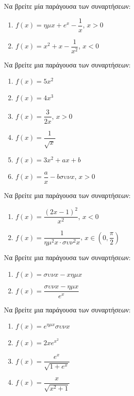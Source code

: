 \documentclass{presentation}
\begin{document}
\begin{askisi}
  Να βρείτε μία παράγουσα των συναρτήσεων:
  \begin{enumerate}[<+->]
    \item $f(x)=ημx+e^x-\dfrac{1}{x}$, $x>0$
    \item $f(x)=x^2+x-\dfrac{1}{x^2}$, $x<0$
  \end{enumerate}
\end{askisi}

\begin{askisi}
  Να βρείτε μια παράγουσα των συναρτήσεων:
  \begin{enumerate}[<+->]
    \item $f(x)=5x^2$
    \item $f(x)=4x^3$
    \item $f(x)=\dfrac{3}{2x}$, $x>0$
    \item $f(x)=\dfrac{1}{\sqrt{x}}$
    \item $f(x)=3x^2+ax+b$
    \item $f(x)=\dfrac{a}{x}-bσυνx$, $x>0$
  \end{enumerate}
\end{askisi}

\begin{askisi}
  Να βρείτε μια παράγουσα των συναρτήσεων:
  \begin{enumerate}[<+->]
    \item $f(x)=\dfrac{(2x-1)^2}{x^2}$, $x<0$
    \item $f(x)=\dfrac{1}{ημ^2x\cdot συν^2x}$, $x\in \left( 0,\dfrac{π}{2} \right) $
  \end{enumerate}
\end{askisi}

\begin{askisi}
  Να βρείτε μια παράγουσα των συναρτήσεων:
  \begin{enumerate}[<+->]
    \item $f(x)=συνx-xημx$
    \item $f(x)=\dfrac{συνx-ημx}{e^x}$
  \end{enumerate}
\end{askisi}

\begin{askisi}
  Να βρείτε μια παράγουσα των συναρτήσεων:
  \begin{enumerate}[<+->]
    \item $f(x)=e^{ημx}συνx$
    \item $f(x)=2xe^{x^2}$
    \item $f(x)=\dfrac{e^x}{\sqrt{1+e^x}}$
    \item $f(x)=\dfrac{x}{\sqrt{x^2+1}}$
  \end{enumerate}
\end{askisi}
\end{document}
